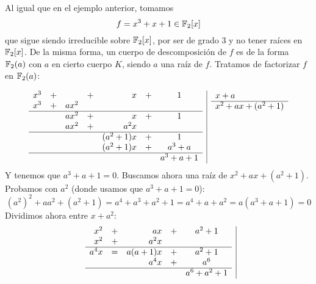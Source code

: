 \begin{ejemplo}
    Al igual que en el ejemplo anterior, tomamos
    \begin{equation*}
        f = x^3+x+1 \in \mathbb{F}_2[x]
    \end{equation*}
    que sigue siendo irreducible sobre $\mathbb{F}_2[x]$, por ser de grado 3 y no tener raíces en $\mathbb{F}_2[x]$. De la misma forma, un cuerpo de descomposición de $f$ es de la forma $\mathbb{F}_2(a)$ con $a$ en cierto cuerpo $K$, siendo $a$ una raíz de $f$. Tratamos de factorizar $f$ en $\mathbb{F}_2(a)$:

    \begin{equation*}
        \begin{array}{r|c}
            \begin{array}{rcrcrcc}
                x^3&+&&+&x&+&1 \\
                x^3&+&ax^2 && &&\\
                \hline
                   &&ax^2&+&x&+&1  \\
                   &&ax^2&+&a^2x&& \\
                   \hline
                   &&&&(a^2 +1)x &+&1 \\
                   &&&&(a^2+1)x &+&a^3 + a \\
                   \hline
                   &&&&&& a^3 + a + 1
            \end{array} & 
            \begin{array}{l}
                x+a \\
                \hline
                x^2+ax+(a^2+1) \\ \\ \\ \\ \\ \\
            \end{array}
        \end{array}
    \end{equation*}
    Y tenemos que $a^3+a+1 = 0$. Buscamos ahora una raíz de $x^2+ax+(a^2+1)$. Probamos con $a^2$ (donde usamos que $a^3 + a + 1 = 0$):
    \begin{equation*}
        {\left(a^2\right)}^{2}+ aa^2 + (a^2+1) = a^4 + a^3 + a^2 + 1 = a^4 + a + a^2 = a(a^3 + a + 1) = 0
    \end{equation*}
    Dividimos ahora entre $x+a^2$:
    \begin{equation*}
        \begin{array}{r|c}
            \begin{array}{rcrcc}
                x^2 &+& ax &+& a^2 +1 \\
                x^2 &+& a^2 x && \\
                \hline
                     a^4x &=& a(a+1)x &+& a^2 + 1 \\
                          && a^4x &+& a^6 \\
                          \hline
                          &&&& a^6+a^2 +1


\end{array}
\end{array}
\end{equation*}
\end{ejemplo}
